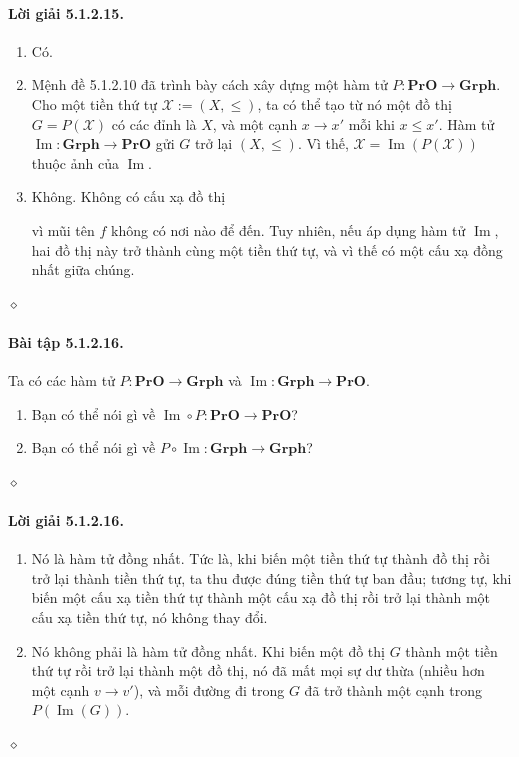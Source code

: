 \paragraph{Lời giải 5.1.2.15.}
\begin{enumerate}[label=\alph*.]
\item Có.
\item Mệnh đề 5.1.2.10 đã trình bày cách xây dựng một hàm tử $P:\mathbf{PrO}\to\mathbf{Grph}$. Cho một tiền thứ tự $\mathcal X:=(X,\leq)$, ta có thể tạo từ nó một đồ thị $G=P(\mathcal X)$ có các đỉnh là $X$, và một cạnh $x\to x'$ mỗi khi $x\leq x'$. Hàm tử $\operatorname{Im}:\mathbf{Grph}\to\mathbf{PrO}$ gửi $G$ trở lại $(X,\leq)$. Vì thế, $\mathcal X=\operatorname{Im}(P(\mathcal X))$ thuộc ảnh của $\operatorname{Im}$.
\item Không. Không có cấu xạ đồ thị
\begin{center}\end{center}
vì mũi tên $f$ không có nơi nào để đến. Tuy nhiên, nếu áp dụng hàm tử $\operatorname{Im}$, hai đồ thị này trở thành cùng một tiền thứ tự, và vì thế có một cấu xạ đồng nhất giữa chúng.
\end{enumerate}\hfill$\diamond$
\paragraph{Bài tập 5.1.2.16.} Ta có các hàm tử $P:\mathbf{PrO}\to\mathbf{Grph}$ và $\operatorname{Im}:\mathbf{Grph}\to\mathbf{PrO}$.
\begin{enumerate}[label=\alph*.]\item Bạn có thể nói gì về $\operatorname{Im}\circ P:\mathbf{PrO}\to\mathbf{PrO}$?\item Bạn có thể nói gì về $P\circ\operatorname{Im}:\mathbf{Grph}\to\mathbf{Grph}$?\end{enumerate}\hfill$\diamond$
\paragraph{Lời giải 5.1.2.16.}
\begin{enumerate}[label=\alph*.]
\item Nó là hàm tử đồng nhất. Tức là, khi biến một tiền thứ tự thành đồ thị rồi trở lại thành tiền thứ tự, ta thu được đúng tiền thứ tự ban đầu; tương tự, khi biến một cấu xạ tiền thứ tự thành một cấu xạ đồ thị rồi trở lại thành một cấu xạ tiền thứ tự, nó không thay đổi.
\item Nó không phải là hàm tử đồng nhất. Khi biến một đồ thị $G$ thành một tiền thứ tự rồi trở lại thành một đồ thị, nó đã mất mọi sự dư thừa (nhiều hơn một cạnh $v\to v'$), và mỗi đường đi trong $G$ đã trở thành một cạnh trong $P(\operatorname{Im}(G))$.
\end{enumerate}\hfill$\diamond$
